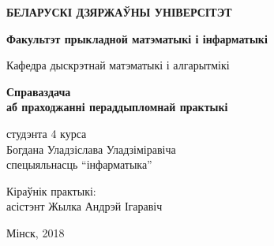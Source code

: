 \begin{titlepage}
    \begin{center}
        {\bf БЕЛАРУСКІ ДЗЯРЖАЎНЫ УНІВЕРСІТЭТ}
    \end{center}
    \begin{center}
        {\bf Факультэт прыкладной матэматыкі і інфарматыкі}
    \end{center}
    \begin{center}
        Кафедра дыскрэтнай матэматыкі і алгарытмікі
    \end{center}

    \vspace{8em}

    \begin{center}
        \textbf{
          Справаздача \\
          аб праходжанні пераддыпломнай практыкі
        }
    \end{center}

    \vspace{3em}

    \begin{flushright}
        студэнта 4 курса \\
        Богдана Уладзіслава Уладзіміравіча \\
        спецыяльнасць ``інфарматыка'' \\
    \end{flushright}

    \vspace{1em}

    \begin{flushright}
        Кіраўнік практыкі:\\
        асістэнт Жылка Андрэй Ігаравіч \\
    \end{flushright}

    \vfill

    \begin{center}
        Мінск, 2018
    \end{center}
\end{titlepage}
\newpage
